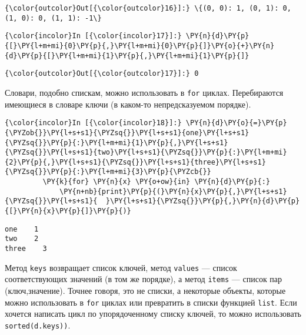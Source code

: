             \begin{Verbatim}[commandchars=\\\{\}]
{\color{outcolor}Out[{\color{outcolor}16}]:} \{(0, 0): 1, (0, 1): 0, (1, 0): 0, (1, 1): -1\}
\end{Verbatim}
        
    \begin{Verbatim}[commandchars=\\\{\}]
{\color{incolor}In [{\color{incolor}17}]:} \PY{n}{d}\PY{p}{[}\PY{l+m+mi}{0}\PY{p}{,}\PY{l+m+mi}{0}\PY{p}{]}\PY{o}{+}\PY{n}{d}\PY{p}{[}\PY{l+m+mi}{1}\PY{p}{,}\PY{l+m+mi}{1}\PY{p}{]}
\end{Verbatim}

            \begin{Verbatim}[commandchars=\\\{\}]
{\color{outcolor}Out[{\color{outcolor}17}]:} 0
\end{Verbatim}
        
    Словари, подобно спискам, можно использовать в \texttt{for} циклах.
Перебираются имеющиеся в словаре ключи (в каком-то непредсказуемом
порядке).

    \begin{Verbatim}[commandchars=\\\{\}]
{\color{incolor}In [{\color{incolor}18}]:} \PY{n}{d}\PY{o}{=}\PY{p}{\PYZob{}}\PY{l+s+s1}{\PYZsq{}}\PY{l+s+s1}{one}\PY{l+s+s1}{\PYZsq{}}\PY{p}{:}\PY{l+m+mi}{1}\PY{p}{,}\PY{l+s+s1}{\PYZsq{}}\PY{l+s+s1}{two}\PY{l+s+s1}{\PYZsq{}}\PY{p}{:}\PY{l+m+mi}{2}\PY{p}{,}\PY{l+s+s1}{\PYZsq{}}\PY{l+s+s1}{three}\PY{l+s+s1}{\PYZsq{}}\PY{p}{:}\PY{l+m+mi}{3}\PY{p}{\PYZcb{}}
         \PY{k}{for} \PY{n}{x} \PY{o+ow}{in} \PY{n}{d}\PY{p}{:}
             \PY{n+nb}{print}\PY{p}{(}\PY{n}{x}\PY{p}{,}\PY{l+s+s1}{\PYZsq{}}\PY{l+s+s1}{  }\PY{l+s+s1}{\PYZsq{}}\PY{p}{,}\PY{n}{d}\PY{p}{[}\PY{n}{x}\PY{p}{]}\PY{p}{)}
\end{Verbatim}

    \begin{Verbatim}[commandchars=\\\{\}]
one    1
two    2
three    3

    \end{Verbatim}

    Метод \texttt{keys} возвращает список ключей, метод \texttt{values} ---
список соответствующих значений (в том же порядке), а метод
\texttt{items} --- список пар (ключ,значение). Точнее говоря, это не
списки, а некоторые объекты, которые можно использовать в \texttt{for}
циклах или превратить в списки функцией \texttt{list}. Если хочется
написать цикл по упорядоченному списку ключей, то можно использовать
\texttt{sorted(d.keys))}.

